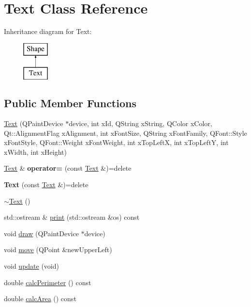 \hypertarget{classText}{\section{Text Class Reference}
\label{classText}
}
Inheritance diagram for Text\-:\begin{figure}[H]
\begin{center}
\leavevmode
\includegraphics[height=2.000000cm]{classText}
\end{center}
\end{figure}
\subsection*{Public Member Functions}
\begin{DoxyCompactItemize}
\item 
\hyperlink{classText_a33b6e89d37f8d0db9abaa02a82a5d7ed}{Text} (Q\-Paint\-Device $\ast$device, int x\-Id, Q\-String x\-String, Q\-Color x\-Color, Qt\-::\-Alignment\-Flag x\-Alignment, int x\-Font\-Size, Q\-String x\-Font\-Family, Q\-Font\-::\-Style x\-Font\-Style, Q\-Font\-::\-Weight x\-Font\-Weight, int x\-Top\-Left\-X, int x\-Top\-Left\-Y, int x\-Width, int x\-Height)
\item 
\hypertarget{classText_ae3709f44652cc1623ba2e12fd01aa983}{\hyperlink{classText}{Text} \& {\bfseries operator=} (const \hyperlink{classText}{Text} \&)=delete}\label{classText_ae3709f44652cc1623ba2e12fd01aa983}

\item 
\hypertarget{classText_afc7da0fb8a91ece6da90c6876e9d9539}{{\bfseries Text} (const \hyperlink{classText}{Text} \&)=delete}\label{classText_afc7da0fb8a91ece6da90c6876e9d9539}

\item 
\hyperlink{classText_a2d49e5c280e205125b149f7777ae30c7}{$\sim$\-Text} ()
\item 
std\-::ostream \& \hyperlink{classText_a8ae9525e9734ed2b9e00aa53fb472f67}{print} (std\-::ostream \&os) const 
\item 
void \hyperlink{classText_ad6dfd5f6e6f1aa974c0ab433abbb5509}{draw} (Q\-Paint\-Device $\ast$device)
\item 
void \hyperlink{classText_a5586919a299988fdcdfd68e77915625d}{move} (Q\-Point \&new\-Upper\-Left)
\item 
void \hyperlink{classText_a04fa355437faa0911800bbf110bf8f0e}{update} (void)
\item 
double \hyperlink{classText_afa52da1ba9611cb0ae79f7a93b89388d}{calc\-Perimeter} () const 
\item 
double \hyperlink{classText_aa64572ee7df26460030d9bf116ad52c8}{calc\-Area} () const 
\end{DoxyCompactItemize}
